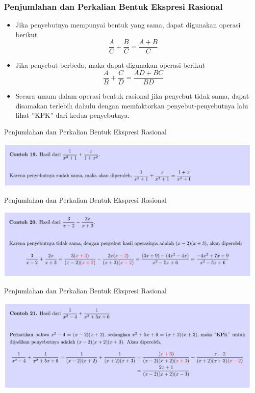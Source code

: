 \documentclass[pdflatex,compress,mathserif]{beamer}
\begin{document}
\begin{frame}
	\frametitle{Penjumlahan dan Perkalian Bentuk Ekspresi Rasional}
	\begin{itemize}
		\item Jika penyebutnya mempunyai bentuk yang sama, dapat digunakan operasi berikut
		\begin{equation*}
			\frac{A}{C} + \frac{B}{C} = \frac{A + B}{C}
		\end{equation*}
		\item Jika penyebut berbeda, maka dapat digunakan operasi berikut
		\begin{equation*}
			\frac{A}{B} + \frac{C}{D} = \frac{AD + BC}{BD}
		\end{equation*}
		\item Secara umum dalam operasi bentuk rasional jika penyebut tidak sama, dapat disamakan terlebih dahulu dengan memfaktorkan penyebut-penyebutnya lalu lihat ”KPK” dari kedua penyebutnya.
	\end{itemize}
\end{frame}

\begin{frame}{Penjumlahan dan Perkalian Bentuk Ekspresi Rasional}
	\begin{center}
		\includegraphics[width=\linewidth]{img/img37}
	\end{center}
\end{frame}

\begin{frame}{Penjumlahan dan Perkalian Bentuk Ekspresi Rasional}
	\begin{center}
		\includegraphics[width=\linewidth]{img/img38}
	\end{center}
\end{frame}

\begin{frame}{Penjumlahan dan Perkalian Bentuk Ekspresi Rasional}
	\begin{center}
		\includegraphics[width=\linewidth]{img/img39}
	\end{center}
\end{frame}
\end{document}
